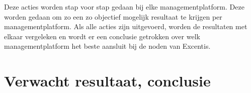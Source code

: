 Deze acties worden stap voor stap gedaan bij elke managementplatform. Deze worden gedaan om zo een zo objectief mogelijk resultaat te krijgen per managementplatform.
Als alle acties zijn uitgevoerd, worden de resultaten met elkaar vergeleken en wordt er een conclusie getrokken over welk managementplatform het beste aansluit bij de noden van Excentis.






\section{Verwacht resultaat, conclusie}%
\label{sec:verwachte_resultaten}

